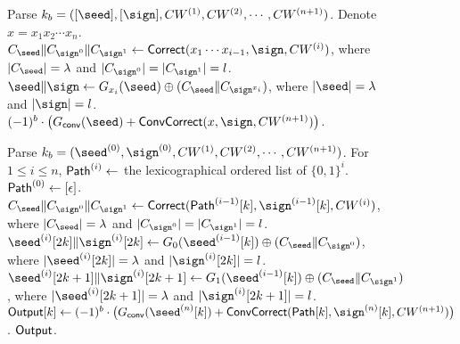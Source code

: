 \begin{figure*}
\begin{breakablealgorithm}
\begin{algorithmic}[1]
      \State Parse $k_b = ([\seed],[\sign],CW^{(1)},CW^{(2)},\cdots,CW^{(n+1)})$. 
      \State Denote $x=x_1x_2\cdots x_n$. 
        \State $C_\seed\|C_{\sign^0}\|C_{\sign^1}\gets {\sf Correct}(x_1\cdots x_{i-1},\sign,CW^{(i)})$, where $|C_\seed| = \lambda$ and $|C_{\sign^0}| = |C_{\sign^1}| = l$. \label{alg:paradigm_correction}
        \State $\seed\|\sign\gets G_{x_i}(\seed)\oplus(C_{\seed}\|C_{\sign^{x_i}})$, where $|\seed|=\lambda$ and $|\sign|=l$. \label{alg:paradigm_seed_sign}
      \EndFor
      \State \Return $(-1)^b\cdot \big(G_{\sf conv}(\seed)+{\sf ConvCorrect}(x,\sign,CW^{(n+1)})\big)$. \label{alg:paradigm_convert_correction}
      \EndProcedure
      \item[]
      \State Parse $k_b=(\seed^{(0)},\sign^{(0)},CW^{(1)},CW^{(2)},\cdots,CW^{(n+1)})$. 
      \State For $1\le i\le n$, ${\sf Path}^{(i)}\gets$ the lexicographical ordered list of $\{0,1\}^i$. ${\sf Path}^{(0)}\gets[\epsilon]$. 
      \State{}
          \State $C_\seed\|C_{\sign^0}\|C_{\sign^1}\gets {\sf Correct}({\sf Path}^{(i-1)}[k],\sign^{(i-1)}[k],CW^{(i)})$, where $|C_\seed| = \lambda$ and $|C_{\sign^0}| = |C_{\sign^1}| = l$. 
          \State $\seed^{(i)}[2k]\|\sign^{(i)}[2k]\gets G_0(\seed^{(i-1)}[k])\oplus (C_\seed\|C_{\sign^0})$, where $|\seed^{(i)}[2k]|=\lambda$ and $|\sign^{(i)}[2k]|=l$. 
          \State $\seed^{(i)}[2k+1]\|\sign^{(i)}[2k+1]\gets G_1(\seed^{(i-1)}[k])\oplus (C_\seed\|C_{\sign^1})$, where $|\seed^{(i)}[2k+1]|=\lambda$ and $|\sign^{(i)}[2k+1]|=l$. 
        \EndFor
      \EndFor
        \State ${\sf Output}[k]\gets (-1)^b\cdot \big(G_{\sf conv}(\seed^{(n)}[k])+{\sf ConvCorrect}({\sf Path}[k],\sign^{(n)}[k],CW^{(n+1)})\big)$.
      \EndFor
      \State\Return $\sf Output$. 
      \EndProcedure
      \end{algorithmic}
    \end{breakablealgorithm}  
  \end{figure*}